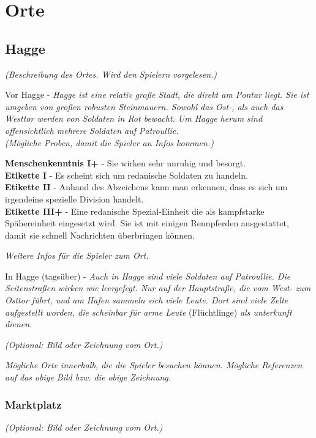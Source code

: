 {\let\clearpage\relax\chapter{Orte}}

\section{Hagge}
\textit{(Beschreibung des Ortes. Wird den Spielern vorgelesen.)}

Vor Hagge - \textit{Hagge ist eine relativ große Stadt, die direkt am Pontar liegt. Sie ist umgeben von großen robusten Steinmauern. Sowohl das Ost-, als auch das Westtor werden von Soldaten in Rot bewacht. Um Hagge herum sind offensichtlich mehrere Soldaten auf Patroullie.}\\ 

\textit{(Mögliche Proben, damit die Spieler an Infos kommen.)}

\textbf{Menschenkenntnis I+} - Sie wirken sehr unruhig und besorgt. \\
\textbf{Etikette I} - Es scheint sich um redanische Soldaten zu handeln. \\
\textbf{Etikette II} - Anhand des Abzeichens kann man erkennen, dass es sich um irgendeine spezielle Division handelt.\\
\textbf{Etikette III+} - Eine redanische Spezial-Einheit die als kampfstarke Spähereinheit eingesetzt wird. Sie ist mit einigen Rennpferden ausgestattet, damit sie schnell Nachrichten überbringen können. 

\textit{Weitere Infos für die Spieler zum Ort.}

In Hagge (tagsüber) - \textit{Auch in Hagge sind viele Soldaten auf Patroullie. Die Seitenstraßen wirken wie leergefegt. Nur auf der Hauptstraße, die vom West- zum Osttor führt, und am Hafen sammeln sich viele Leute. Dort sind viele Zelte aufgestellt worden, die scheinbar für arme Leute} (Flüchtlinge) \textit{als unterkunft dienen.}

\textit{(Optional: Bild oder Zeichnung vom Ort.)}

\textit{Mögliche Orte innerhalb, die die Spieler besuchen können. Mögliche Referenzen auf das obige Bild bzw. die obige Zeichnung.}

\subsection{Marktplatz} 
\textit{(Optional: Bild oder Zeichnung vom Ort.)}

